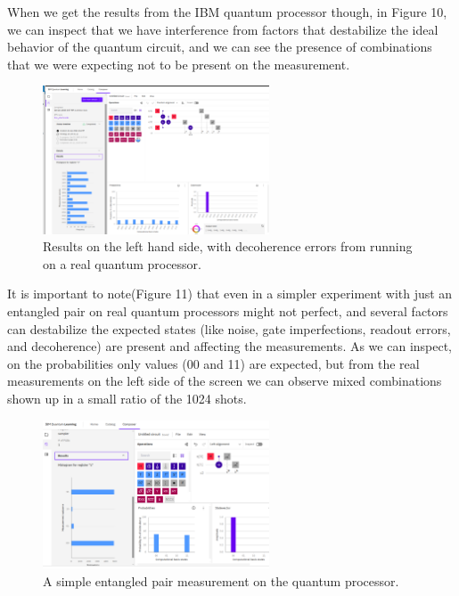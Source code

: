 \documentclass[12pt]{ieeetj}
\begin{document}
		When we get the results from the IBM quantum processor though, in Figure 10, we can inspect that we have 
		interference from factors that destabilize the ideal behavior of the quantum circuit, 
		and we can see the presence of combinations that we were expecting not to be present
		on the measurement.

		\begin{figure}[H]
			\centering
			\includegraphics[width=0.6\textwidth]{ibmq/real_entanglement.png}
			\caption{Results on the left hand side, with decoherence errors from running on a real quantum processor.}
			\label{fig10:}
		\end{figure}		
		


		It is important to note(Figure 11) that even in a simpler experiment with just an entangled pair on real 
		quantum processors might not perfect, and several factors can destabilize the expected states 
		(like noise, gate imperfections, readout errors, and decoherence) are present and affecting the measurements.
		As we can inspect, on the probabilities only values (00 and 11) are expected, but from the real measurements 
		on the left side of the screen we can observe mixed combinations shown up in a small ratio of the 1024 shots.
		
		\begin{figure}[H]
			\centering
			\includegraphics[width=0.6\textwidth]{ibmq/e.png}
			\caption{A simple entangled pair measurement on the quantum processor.}
			\label{fig11:}
		\end{figure}		
		
\end{document}
